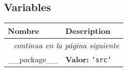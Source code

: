   \subsection{Variables}

    \vspace{-1cm}
\hspace{\varindent}\begin{longtable}{|p{\varnamewidth}|p{\vardescrwidth}|l}
\cline{1-2}
\cline{1-2} \centering \textbf{Nombre} & \centering \textbf{Description}& \\
\cline{1-2}
\endhead\cline{1-2}\multicolumn{3}{r}{\small\textit{continua en la página siguiente}}\\\endfoot\cline{1-2}
\endlastfoot\raggedright \_\-\_\-p\-a\-c\-k\-a\-g\-e\-\_\-\_\- & \raggedright \textbf{Valor:} 
{\tt \texttt{'}\texttt{src}\texttt{'}}&\\
\cline{1-2}
\end{longtable}

